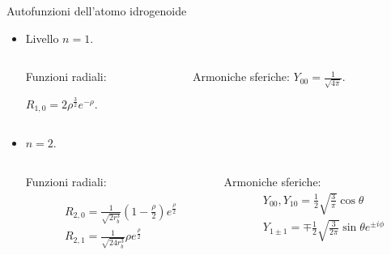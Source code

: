 \begin{frame}{Autofunzioni dell'atomo idrogenoide}


\begin{itemize}
\item Livello $n=1$.

\begin{columns}
\begin{column}{0.5\textwidth}


Funzioni radiali:

$R_{1,0}=2\rho^\frac{3}{2}e^{-\rho}$.
\end{column}
\begin{column}{0.5\textwidth}

Armoniche sferiche:
$Y_{00}=\frac{1}{\sqrt{4\pi}}$.
\end{column}
\end{columns}

\item $n=2$.
\begin{columns}[T]
\begin{column}{0.5\textwidth}
Funzioni radiali:

\begin{align*}
&R_{2,0}=\frac{1}{\sqrt{2r_b^3}}(1-\frac{\rho}{2})e^{\frac{\rho}{2}}\\
&R_{2,1}=\frac{1}{\sqrt{24r_b^3}}\rho e^{\frac{\rho}{2}}
\end{align*}
\end{column}
\begin{column}{0.5\textwidth}
Armoniche sferiche:
\begin{align*}
&Y_{00}, Y_{10}=\frac{1}{2}\sqrt{\frac{3}{\pi}}\cos{\theta}\\
&Y_{1\pm1}=\mp\frac{1}{2}\sqrt{\frac{3}{2\pi}}\sin{\theta}e^{\pm i\phi}
\end{align*}
\end{column}
\end{columns}


\end{itemize}
\end{frame}
